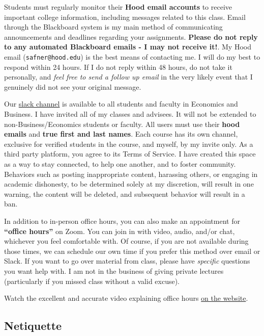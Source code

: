\documentclass{article}
\begin{document}
Students must regularly monitor their \textbf{Hood email accounts} to
receive important college information, including messages related to
this class. Email through the Blackboard system is my main method of
communicating announcements and deadlines regarding your assignments.
\textbf{Please do not reply to any automated Blackboard emails - I may
not receive it!}. My Hood email (\texttt{safner@hood.edu}) is the best
means of contacting me. I will do my best to respond within 24 hours. If
I do not reply within 48 hours, do not take it personally, and
\emph{feel free to send a follow up email} in the very likely event that
I genuinely did not see your original message.

Our \href{https://hoodcollegeeconomics.slack.com}{slack channel} is
available to all students and faculty in Economics and Business. I have
invited all of my classes and advisees. It will not be extended to
non-Business/Economics students or faculty. All users must use their
\textbf{hood emails} and \textbf{true first and last names}. Each course
has its own channel, exclusive for verified students in the course, and
myself, by my invite only. As a third party platform, you agree to its
Terms of Service. I have created this space as a way to stay connected,
to help one another, and to foster community. Behaviors such as posting
inappropriate content, harassing others, or engaging in academic
dishonesty, to be determined solely at my discretion, will result in one
warning, the content will be deleted, and subsequent behavior will
result in a ban.

In addition to in-person office hours, you can also make an appointment
for \textbf{``office hours''} on Zoom. You can join in with video,
audio, and/or chat, whichever you feel comfortable with. Of course, if
you are not available during those times, we can schedule our own time
if you prefer this method over email or Slack. If you want to go over
material from class, please have \emph{specific} questions you want help
with. I am not in the business of giving private lectures (particularly
if you missed class without a valid excuse).

Watch the excellent and accurate video explaining office hours
\href{https://gamef21.classes.ryansafner.com/syllabus/\#communication-email-slack-and-virtual-office-hours}{on
the website}.

\hypertarget{netiquette}{%
\subsection{Netiquette}\label{netiquette}}
\end{document}
